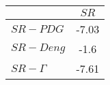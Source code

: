 \begin{tabular}{l|c}
\toprule
{} &  $SR$ \\
\midrule
\textbf{$SR-PDG$   } & -7.03 \\
\textbf{$SR-Deng$  } &  -1.6 \\
\textbf{$SR-\Gamma$} & -7.61 \\
\bottomrule
\end{tabular}
